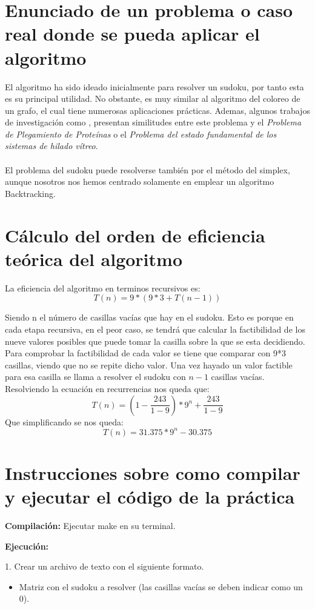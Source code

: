 \documentclass[11pt, a4paper]{article}
\theoremstyle{theorem-style}
\theoremstyle{definition-style}
\theoremstyle{remark-style}
\theoremstyle{example-style}
\begin{document}
\section{Enunciado de un problema o caso real donde se pueda aplicar el algoritmo}

El algoritmo ha sido ideado inicialmente para resolver un sudoku, por tanto esta es su principal utilidad.  No obstante, es muy similar al algoritmo del coloreo de un grafo, el cual tiene numerosas aplicaciones prácticas. Ademas, algunos trabajos de investigación como \cite{sudoku}, presentan similitudes entre este problema y el \textit{Problema de Plegamiento de Proteínas} o el \textit{Problema del estado fundamental de los sistemas de hilado vítreo}.
\paragraph{}
El problema del sudoku puede resolverse también por el método del simplex, aunque nosotros nos hemos centrado solamente en emplear un algoritmo Backtracking.
\section{Cálculo del orden de eficiencia teórica del algoritmo }
La eficiencia del algoritmo en terminos recursivos es: $$ T(n) = 9*(9*3 + T(n-1))$$

Siendo n el número de casillas vacías que hay en el sudoku. Esto es porque en cada etapa recursiva, en el peor caso, se tendrá que calcular la factibilidad de los nueve valores posibles que puede tomar la casilla sobre la que se esta decidiendo. Para comprobar la factibilidad de cada valor se tiene que comparar con 9*3 casillas, viendo que no se repite dicho valor. Una vez hayado un valor factible para esa casilla se llama a resolver el sudoku con $n-1$ casillas vacías. Resolviendo la ecuación en recurrencias nos queda que: $$ T(n) = (1 - \frac{243}{1-9})*9^n + \frac{243}{1-9}$$ Que simplificando se nos queda: $$T(n) = 31.375*9^n - 30.375 $$



\section{Instrucciones sobre como compilar y ejecutar el código de la práctica}


\textbf{Compilación:} Ejecutar make en su terminal.

\textbf{Ejecución:} 

1. Crear un archivo de texto con el siguiente formato.
\begin{itemize}
\item Matriz con el sudoku a resolver (las casillas vacías se deben indicar como un 0).
\end{itemize}
\end{document}
